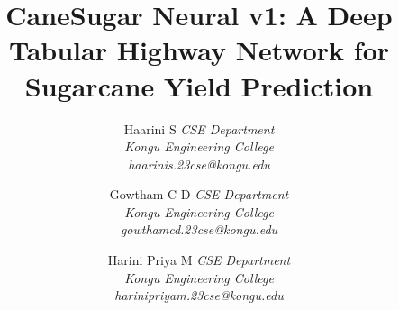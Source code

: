 \documentclass[conference,10pt,letterpaper]{IEEEtran}
\providecommand{\IEEEauthorblockN}[1]{#1}
\providecommand{\IEEEauthorblockA}[1]{\textit{#1}}
\begin{document}
\title{CaneSugar Neural v1: A Deep Tabular Highway Network for Sugarcane Yield Prediction}

\author{
\IEEEauthorblockN{Haarini S}
\IEEEauthorblockA{
CSE Department\\
Kongu Engineering College\\
haarinis.23cse@kongu.edu
}
\and
\IEEEauthorblockN{Gowtham C D}
\IEEEauthorblockA{
CSE Department\\
Kongu Engineering College\\
gowthamcd.23cse@kongu.edu
}
\and
\IEEEauthorblockN{Harini Priya M}
\IEEEauthorblockA{
CSE Department\\
Kongu Engineering College\\
harinipriyam.23cse@kongu.edu
}
}

\maketitle
\end{document}
